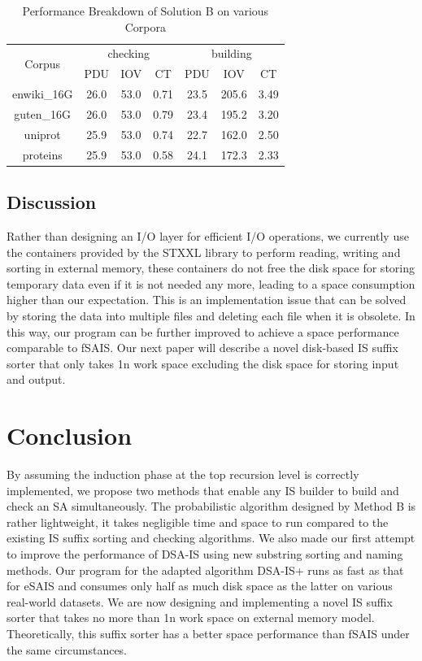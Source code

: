 \documentclass[10pt,journal,compsoc]{IEEEtran}
\begin{document}
\begin{table}%
	\caption{Performance Breakdown of Solution B on various Corpora}
	\label{tbl:breakdown_solutionb}
	\centering
	\begin{tabular}{|c|c|c|c|c|c|c|}
		\hline
		\multirow{2}{*}{Corpus} & \multicolumn{3}{|c}{checking} & \multicolumn{3}{|c|}{building} \\\cline{2-7}
		& PDU & IOV & CT & PDU & IOV & CT \\\hline
		enwiki\_16G & 26.0 & 53.0 & 0.71 & 23.5 & 205.6 & 3.49 \\\hline
		guten\_16G & 26.0 & 53.0 & 0.79 & 23.4 & 195.2 & 3.20 \\\hline
		uniprot & 25.9 & 53.0 & 0.74 & 22.7 & 162.0 & 2.50 \\\hline
		proteins & 25.9 & 53.0 & 0.58 & 24.1 & 172.3 & 2.33 \\\hline
	\end{tabular}
\end{table}%

\subsection{Discussion}

Rather than designing an I/O layer for efficient I/O operations, we currently use the containers provided by the STXXL library to perform reading, writing and sorting in external memory, these containers do not free the disk space for storing temporary data even if it is not needed any more, leading to a space consumption higher than our expectation. This is an implementation issue that can be solved by storing the data into multiple files and deleting each file when it is obsolete. In this way, our program can be further improved to achieve a space performance comparable to fSAIS. Our next paper will describe a novel disk-based IS suffix sorter that only takes 1n work space excluding the disk space for storing input and output. 

\section{Conclusion} \label{sec:conclusion}

By assuming the induction phase at the top recursion level is correctly implemented, we propose two methods that enable any IS builder to build and check an SA simultaneously. The probabilistic algorithm designed by Method B is rather lightweight, it takes negligible time and space to run compared to the existing IS suffix sorting and checking algorithms. We also made our first attempt to improve the performance of DSA-IS using new substring sorting and naming methods. Our program for the adapted algorithm DSA-IS+ runs as fast as that for eSAIS and consumes only half as much disk space as the latter on various real-world datasets. We are now designing and implementing a novel IS suffix sorter that takes no more than 1n work space on external memory model. Theoretically, this suffix sorter has a better space performance than fSAIS under the same circumstances. 



\end{document}
